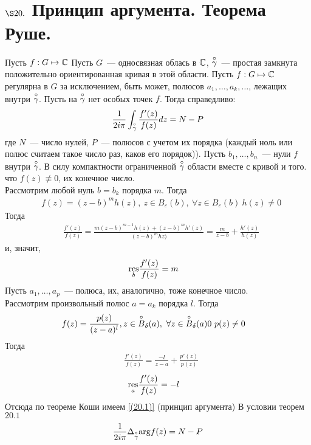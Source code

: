 \section{$\S 20.$ Принцип аргумента. Теорема Руше.}
\theorem
Пусть $f: G \mapsto \mathbb{C}$
Пусть $G$~--- односвязная облась в $\mathbb{C}$, $\overset{\circ}{\gamma}$~--- простая замкнута
положительно ориентированная кривая в этой области. Пусть $f: G \mapsto \mathbb{C}$
регулярна в $G$ за исключением, быть может, полюсов $a_1, \dots, a_k, \dots$,
лежащих внутри $\overset{\circ}{\gamma}$. Пусть на $\overset{\circ}{\gamma}$ нет особых точек $f$. Тогда
справедливо:
\begin{equation}\label{(20.1)}
    \frac{1}{2 i \pi}\int_{\overset{\circ}{\gamma}} \frac{f'(z)}{f(z)}dz = N - P
\end{equation}
где $N$~--- число нулей, $P$~--- полюсов с учетом их порядка (каждый ноль или
полюс считаем такое число раз, каков его порядок)).
\pr
Пусть $b_1, \dots, b_n$~--- нули $f$ внутри $\overset{\circ}{\gamma}$. В силу компактности
ограниченной $\overset{\circ}{\gamma}$ области вместе с кривой и того. что $f(z) \not \equiv 0$,
их конечное число.
\\
Рассмотрим любой нуль $b = b_k$ порядка $m$. Тогда
\begin{align*}
  & f(z) = (z-b)^mh(z), \ z \in B_\varepsilon(b), \ \forall z \in B_\varepsilon(b) \ h(z) \neq 0
\end{align*}
Тогда
\begin{align*}
  & \frac{f'(z)}{f(z)} = \frac{m(z-b)^{m-1}h(z)+(z-b)^mh'(z)}{(z-b)^mhz)} = \frac{m}{z-b} + \frac{h'(z)}{h(z)}
\end{align*}
и, значит,
\begin{align*}
  & \underset{b}{\mathrm{res}}\frac{f'(z)}{f(z)} = m
\end{align*}
Пусть $a_1, \dots, a_p$~--- полюса, их, аналогично, тоже конечное число.
\\
Рассмотрим произвольный полюс $a = a_k$ порядка $l$. Тогда
\begin{align*}
& f(z) = \frac{p(z)}{(z-a)^l}, z \in \os{\circ}{B}_\delta(a), \ \forall z \in \os{\circ}{B}_\delta
(a)0 \ p(z)\neq 0
\end{align*}
Тогда
\begin{align*}
  & \frac{f'(z)}{f(z)} = \frac{-l}{z-a} + \frac{p'(z)}{p(z)}
\end{align*}
\begin{align*}
  & \underset{a}{\mathrm{res}}\frac{f'(z)}{f(z)} = -l
\end{align*}
Отсюда по теореме Коши имеем \eqref{(20.1)}
\corollary (принцип аргумента)
В условии теорем $20.1$
\begin{equation}\label{(20.2)}
  \frac{1}{2 i \pi} \Delta_{\overset{\circ}{\gamma}}\mathrm{arg} f(z) = N - P
\end{equation}
